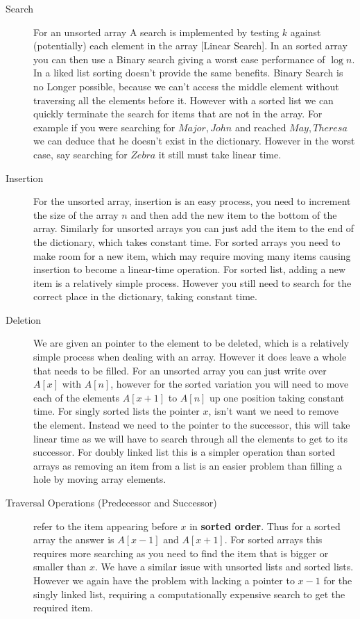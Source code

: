 	\begin{description}
		\item[Search] For an unsorted array A search is implemented by testing $k$ against (potentially) each element in the array [Linear Search]. In an sorted array you can then use a Binary search giving a worst case performance of $\log n$. In a liked list sorting doesn't  provide the same benefits. Binary Search is no Longer possible, because we can't access the middle element without traversing all the elements before it. However with a sorted list we can quickly terminate the search for items that are not in the array. For example if you were searching for $Major, John$ and reached $May, Theresa$ we can deduce that he doesn't exist in the dictionary. However in the worst case, say searching for $Zebra$ it still must take linear time.
		\item[Insertion] For the unsorted array, insertion is an easy process, you need to increment the size of the array $n$ and then add the new item to the bottom of the array. Similarly for unsorted arrays you can just add the item to the end of the dictionary, which takes constant time. For sorted arrays you need to make room for a new item, which may require moving many items causing insertion to become a linear-time operation. For sorted list, adding a new item is a relatively simple process. However you still need to search for the correct place in the dictionary, taking constant time.
		\item[Deletion] We are given an pointer to the element to be deleted, which is a relatively simple process when dealing with an array. However it does leave a whole that needs to be filled. For an unsorted array you can just write over $A[x]$ with $A[n]$, however for the sorted variation you will need to move each of the elements $A[x+1]$ to $A[n]$ up one position taking constant time. For singly sorted lists the pointer $x$, isn't want we need to remove the element. Instead we need to the pointer to the successor, this will take linear time as we will have to search through all the elements to get to its successor. For doubly linked list this is a simpler operation than sorted arrays as removing an item from a list is an easier problem than filling a hole by moving array elements.
		\item[Traversal Operations (Predecessor and Successor)] refer to the item appearing before $x$ in \textbf{sorted order}. Thus for a sorted array the answer is $A[x-1]$ and $A[x+1]$. For sorted arrays this requires more searching as you need to find the item that is bigger or smaller than $x$. We have a similar issue with unsorted lists and sorted lists. However we again have the problem with lacking a pointer to $x-1$ for the singly linked list, requiring a computationally expensive search to get the required item.

\end{description}

